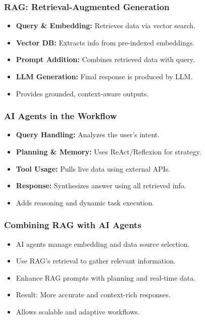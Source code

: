 \begin{frame}[fragile]\frametitle{RAG: Retrieval-Augmented Generation}
    \begin{itemize}
        \item \textbf{Query \& Embedding:} Retrieves data via vector search.
        \item \textbf{Vector DB:} Extracts info from pre-indexed embeddings.
        \item \textbf{Prompt Addition:} Combines retrieved data with query.
        \item \textbf{LLM Generation:} Final response is produced by LLM.
        \item Provides grounded, context-aware outputs.
    \end{itemize}
\end{frame}

\begin{frame}[fragile]\frametitle{AI Agents in the Workflow}
    \begin{itemize}
        \item \textbf{Query Handling:} Analyzes the user’s intent.
        \item \textbf{Planning \& Memory:} Uses ReAct/Reflexion for strategy.
        \item \textbf{Tool Usage:} Pulls live data using external APIs.
        \item \textbf{Response:} Synthesizes answer using all retrieved info.
        \item Adds reasoning and dynamic task execution.
    \end{itemize}
\end{frame}

\begin{frame}[fragile]\frametitle{Combining RAG with AI Agents}
    \begin{itemize}
        \item AI agents manage embedding and data source selection.
        \item Use RAG’s retrieval to gather relevant information.
        \item Enhance RAG prompts with planning and real-time data.
        \item Result: More accurate and context-rich responses.
        \item Allows scalable and adaptive workflows.
    \end{itemize}
\end{frame}

